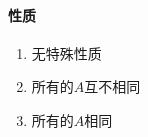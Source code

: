 \documentclass[hyperref,UTF8,12pt,a4paper]{ctexart}
\begin{document}
\paragraph{性质}
\begin{enumerate}
\item 无特殊性质
\item 所有的$A$互不相同
\item 所有的$A$相同
\end{enumerate}
\end{document}
